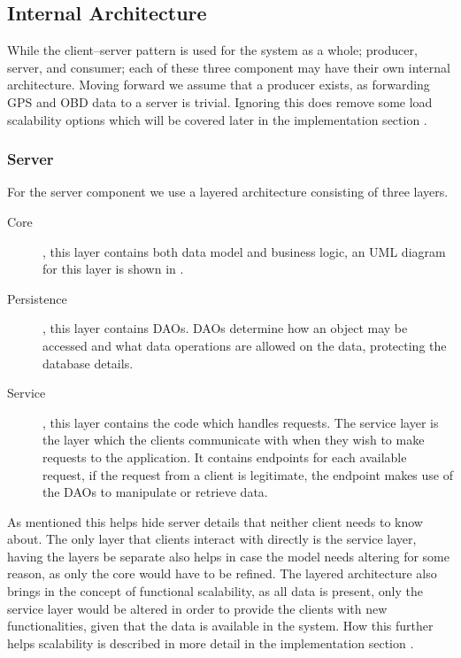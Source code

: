 \subsection{Internal Architecture}
While the client--server pattern is used for the system as a whole; producer, server, and consumer; each of these three component may have their own internal architecture.
Moving forward we assume that a producer exists, as forwarding GPS and \ac{OBD} data to a server is trivial.
Ignoring this does remove some load scalability options which will be covered later in the implementation section .

\subsubsection{Server}
For the server component we use a layered architecture consisting of three layers.
\begin{description}
    \item [Core], this layer contains both data model and business logic, an UML diagram for this layer is shown in .
    \item [Persistence], this layer contains \aclp{DAO}.
    \acsp{DAO} determine how an object may be accessed and what data operations are allowed on the data, protecting the database details.
    \item [Service], this layer contains the code which handles requests.
    The service layer is the layer which the clients communicate with when they wish to make requests to the application.
    It contains endpoints for each available request, if the request from a client is legitimate, the endpoint makes use of the \acsp{DAO} to manipulate or retrieve data.
\end{description}
As mentioned this helps hide server details that neither client needs to know about.
The only layer that clients interact with directly is the service layer, having the layers be separate also helps in case the model needs altering for some reason, as only the core would have to be refined.
The layered architecture also brings in the concept of functional scalability, as all data is present, only the service layer would be altered in order to provide the clients with new functionalities, given that the data is available in the system.
How this further helps scalability is described in more detail in the implementation section .

